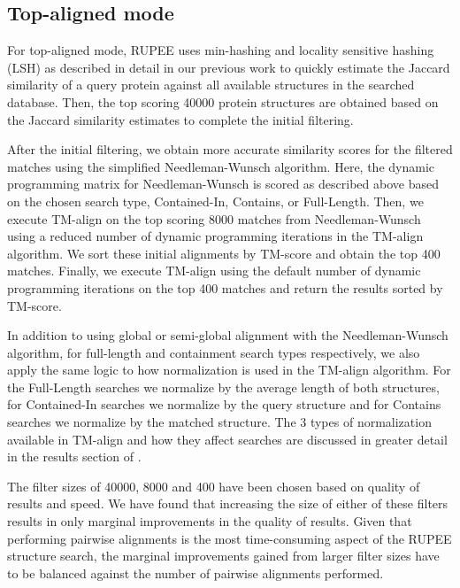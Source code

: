 \documentclass[10pt,letterpaper]{article}
\begin{document}
\subsection*{Top-aligned mode}

For top-aligned mode, RUPEE uses min-hashing \cite{Broder1998} and locality sensitive hashing (LSH) \cite{Indyk1998} as described in detail in our previous work \cite{Ayoub2019} to quickly estimate the Jaccard similarity of a query protein against all available structures in the searched database.  
Then, the top scoring 40000 protein structures are obtained based on the Jaccard similarity estimates to complete the initial filtering. 

After the initial filtering, we obtain more accurate similarity scores for the filtered matches using the simplified Needleman-Wunsch algorithm. 
Here, the dynamic programming matrix for Needleman-Wunsch is scored as described above based on the chosen search type, Contained-In, Contains, or Full-Length. 
Then, we execute TM-align on the top scoring 8000 matches from Needleman-Wunsch using a reduced number of dynamic programming iterations in the TM-align algorithm. 
We sort these initial alignments by TM-score and obtain the top 400 matches.
Finally, we execute TM-align using the default number of dynamic programming iterations on the top 400 matches and return the results sorted by TM-score. 

In addition to using global or semi-global alignment with the Needleman-Wunsch algorithm, for full-length and containment search types respectively, we also apply the same logic to how normalization is used in the TM-align algorithm. 
For the Full-Length searches we normalize by the average length of both structures, for Contained-In searches we normalize by the query structure and for Contains searches we normalize by the matched structure.
The 3 types of normalization available in TM-align and how they affect searches are discussed in greater detail in the results section of \cite{Ayoub2019}.

The filter sizes of 40000, 8000 and 400 have been chosen based on quality of results and speed. 
We have found that increasing the size of either of these filters results in only marginal improvements in the quality of results. 
Given that performing pairwise alignments is the most time-consuming aspect of the RUPEE structure search, the marginal improvements gained from larger filter sizes have to be balanced against the number of pairwise alignments performed. 
\end{document}
